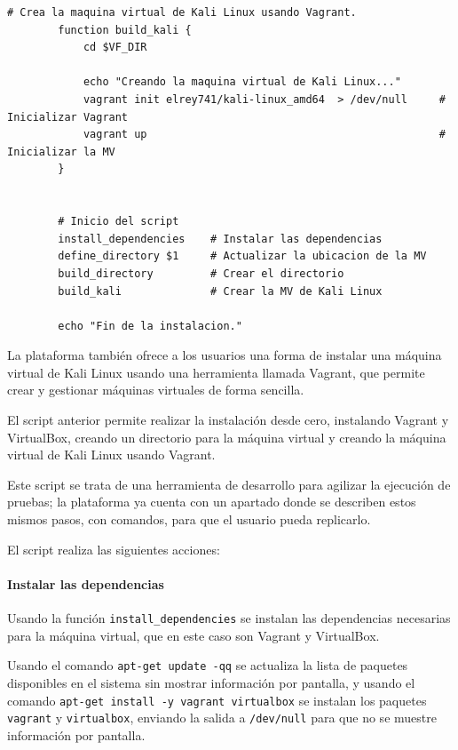 \begin{lstlisting}[style=bash_style, basicstyle=\ttfamily\scriptsize]
        # Crea la maquina virtual de Kali Linux usando Vagrant.
        function build_kali {
            cd $VF_DIR

            echo "Creando la maquina virtual de Kali Linux..."
            vagrant init elrey741/kali-linux_amd64  > /dev/null     # Inicializar Vagrant
            vagrant up                                              # Inicializar la MV
        }


        # Inicio del script
        install_dependencies    # Instalar las dependencias
        define_directory $1     # Actualizar la ubicacion de la MV
        build_directory         # Crear el directorio
        build_kali              # Crear la MV de Kali Linux

        echo "Fin de la instalacion."
            \end{lstlisting}

            La plataforma también ofrece a los usuarios una forma de instalar una máquina virtual de Kali Linux usando una herramienta llamada Vagrant, que permite crear y gestionar máquinas virtuales de forma sencilla.

            El script anterior permite realizar la instalación desde cero, instalando Vagrant y VirtualBox, creando un directorio para la máquina virtual y creando la máquina virtual de Kali Linux usando Vagrant.

            Este script se trata de una herramienta de desarrollo para agilizar la ejecución de pruebas; la plataforma ya cuenta con un apartado donde se describen estos mismos pasos, con comandos, para que el usuario pueda replicarlo.

            El script realiza las siguientes acciones:

            \paragraph{Instalar las dependencias}

                Usando la función \texttt{install\_dependencies} se instalan las dependencias necesarias para la máquina virtual, que en este caso son Vagrant y VirtualBox.

                Usando el comando \texttt{apt-get update -qq} se actualiza la lista de paquetes disponibles en el sistema sin mostrar información por pantalla, y usando el comando \texttt{apt-get install -y vagrant virtualbox} se instalan los paquetes \texttt{vagrant} y \texttt{virtualbox}, enviando la salida a \texttt{/dev/null} para que no se muestre información por pantalla.


